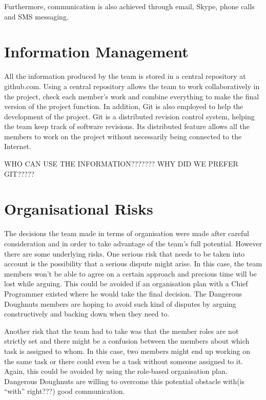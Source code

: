 \documentclass{article}
\begin{document}
Furthermore, communication is also achieved through email, Skype, phone calls and SMS messaging.


\section{Information Management}
\label{info}

All the information produced by the team is stored in a central repository at github.com. Using a central repository allows the team to work collaboratively in the project, check each member's work and combine everything to make the final version of the project function. In addition, Git is also employed to help the development of the project. Git is a distributed revision control system, helping the team keep track of software revisions. Its distributed feature allows all the members to work on the project without necessarily being connected to the Internet.

WHO CAN USE THE INFORMATION??????? WHY DID WE PREFER GIT?????



\section{Organisational Risks}
\label{lastSection}

The decisions the team made in terms of organisation were made after careful consideration and in order to take advantage of the team's full potential. However there are some underlying risks. One serious risk that needs to be taken into account is the possibility that a serious dispute might arise. In this case, the team members won't be able to agree on a certain approach and precious time will be lost while arguing. This could be avoided if an organisation plan with a Chief Programmer existed where he would take the final decision. The Dangerous Doughnuts members are hoping to avoid such kind of disputes by arguing constructively and backing down when they need to.

Another risk that the team had to take was that the member roles are not strictly set and there might be a confusion between the members about which task is assigned to whom. In this case, two members might end up working on the same task or there could even be a task without someone assigned to it. Again, this could be avoided by using the role-based organisation plan. Dangerous Doughnuts are willing to overcome this potential obstacle with(is ``with'' right???) good communication.




\end{document}
